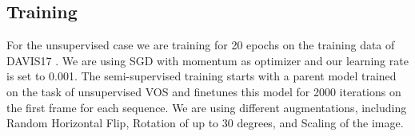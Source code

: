 \subsection{Training}
For the unsupervised case we are training for 20 epochs on the training data of DAVIS17 \cite{davis_2017}. We are using SGD with momentum as optimizer and our learning rate is set to 0.001. The semi-supervised training starts with a parent model trained on the task of unsupervised VOS and finetunes this model for 2000 iterations on the first frame for each sequence. We are using different augmentations, including Random Horizontal Flip, Rotation of up to 30 degrees, and Scaling of the image.